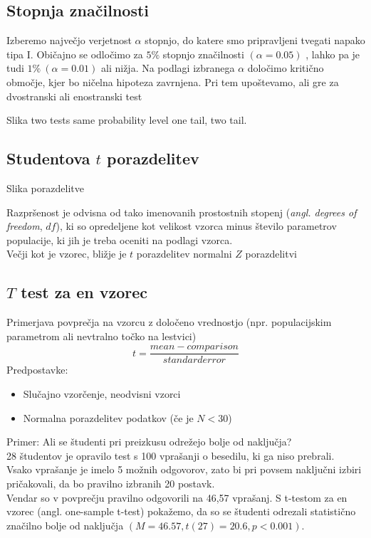 \subsection*{Stopnja značilnosti}

Izberemo največjo verjetnost $\alpha$ stopnjo, do katere smo pripravljeni tvegati napako tipa I. Običajno se odločimo za $5\%$ stopnjo značilnosti $(\alpha = 0.05)$ , lahko pa je tudi $1\%\  (\alpha = 0.01)$ ali nižja. Na podlagi izbranega $\alpha$ določimo kritično območje, kjer bo ničelna hipoteza zavrnjena. Pri tem upoštevamo, ali gre za dvostranski ali enostranski test

Slika two tests same probability level one tail, two tail.

\subsection*{Studentova $t$ porazdelitev}

Slika porazdelitve

Razpršenost je odvisna od tako imenovanih prostostnih stopenj (\textit{angl. degrees of freedom}, $df$), ki so opredeljene kot velikost vzorca minus število parametrov populacije, ki jih je treba oceniti na podlagi vzorca.\\
Večji kot je vzorec, bližje je $t$ porazdelitev normalni $Z$ porazdelitvi

\subsection*{$T$ test za en vzorec}

Primerjava povprečja na vzorcu z določeno vrednostjo (npr. populacijskim parametrom ali nevtralno točko na lestvici)\\
\[t = \frac{mean-comparison}{standard error}\]
Predpostavke:
\begin{itemize}
\item Slučajno vzorčenje, neodvisni vzorci
\item Normalna porazdelitev podatkov (če je $N < 30$)
\end{itemize}

Primer: Ali se študenti pri preizkusu odrežejo bolje od naključja?\\
28 študentov je opravilo test s 100 vprašanji o besedilu, ki ga niso prebrali.\\
Vsako vprašanje je imelo 5 možnih odgovorov, zato bi pri povsem naključni izbiri pričakovali, da bo pravilno izbranih 20 postavk.\\
Vendar so v povprečju pravilno odgovorili na 46,57 vprašanj. S t-testom za en vzorec (angl. one-sample t-test) pokažemo, da so se študenti odrezali statistično značilno bolje od naključja $(M=46.57, t(27)=20.6, p < 0.001)$.

